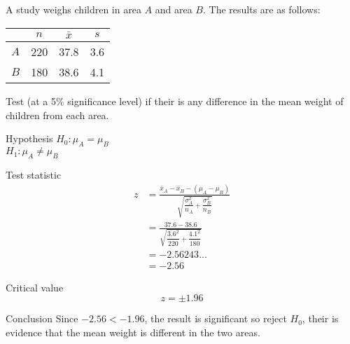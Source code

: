             \begin{example}
            {
                A study weighs children in area $A$ and area $B$. The results are as follows:
                
                \begin{center}
                \begin{tabular}{l|c|c|c}
                    & $n$ & $\bar{x}$ & $s$ \\
                \hline
                $A$ & 220 & 37.8      & 3.6 \\
                $B$ & 180 & 38.6      & 4.1
                \end{tabular}
                \end{center}
                
                Test (at a 5\% significance level) if their is any difference in the mean weight of children from each area.
            }

            \begin{step}{Hypothesis}
            $H_0: \mu_A = \mu_B$ \\ 
            $H_1: \mu_A \neq \mu_B$
            \end{step}

            \begin{step}{Test statistic} 
            \begin{align*} 
            z &= \frac{\bar{x}_A-\bar{x}_B - (\mu_A - \mu_B)}{\sqrt{\dfrac{\sigma_A^2}{n_A}+\dfrac{\sigma_B^2}{n_B}}}\\ 
            &= \frac{37.6 - 38.6}{\sqrt{\dfrac{3.6^2}{220}+\dfrac{4.1^2}{180}}}\\ 
            &= -2.56243...\\ 
            &= -2.56 
            \end{align*}
            \end{step}

            \begin{step}{Critical value}
            $$z = \pm1.96$$
            \end{step}

            \begin{step}{Conclusion}
            Since $-2.56 < -1.96$, the result is significant so reject $H_0$, their is evidence that the mean weight is different in the two areas.
            \end{step}

            \end{example}
            
